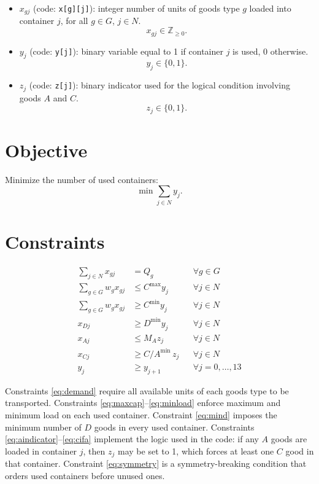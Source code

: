 \begin{itemize}
    \item $x_{g j}$ (code: \texttt{x[g][j]}): integer number of units of goods type $g$ loaded into container $j$, for all $g\in G$, $j\in N$.
    \[
    x_{g j}\in \mathbb{Z}_{\ge 0}.
    \]
    \item $y_j$ (code: \texttt{y[j]}): binary variable equal to 1 if container $j$ is used, 0 otherwise.
    \[
    y_j\in\{0,1\}.
    \]
    \item $z_j$ (code: \texttt{z[j]}): binary indicator used for the logical condition involving goods $A$ and $C$.
    \[
    z_j\in\{0,1\}.
    \]
\end{itemize}

\section*{Objective}

Minimize the number of used containers:
\[
\min \sum_{j\in N} y_j.
\]

\section*{Constraints}

\begin{align}
\sum_{j\in N} x_{g j} &= Q_g && \forall g\in G
\label{eq:demand}
\\
\sum_{g\in G} w_g x_{g j} &\le C^{\max} y_j && \forall j\in N
\label{eq:maxcap}
\\
\sum_{g\in G} w_g x_{g j} &\ge C^{\min} y_j && \forall j\in N
\label{eq:minload}
\\
x_{D j} &\ge D^{\min} y_j && \forall j\in N
\label{eq:mind}
\\
x_{A j} &\le M_A z_j && \forall j\in N
\label{eq:aindicator}
\\
x_{C j} &\ge C/A^{\min}\, z_j && \forall j\in N
\label{eq:cifa}
\\
y_j &\ge y_{j+1} && \forall j=0,\dots,13
\label{eq:symmetry}
\end{align}

Constraints \eqref{eq:demand} require all available units of each goods type to be transported.  
Constraints \eqref{eq:maxcap}--\eqref{eq:minload} enforce maximum and minimum load on each used container.  
Constraint \eqref{eq:mind} imposes the minimum number of $D$ goods in every used container.  
Constraints \eqref{eq:aindicator}--\eqref{eq:cifa} implement the logic used in the code: if any $A$ goods are loaded in container $j$, then $z_j$ may be set to 1, which forces at least one $C$ good in that container.  
Constraint \eqref{eq:symmetry} is a symmetry-breaking condition that orders used containers before unused ones.

